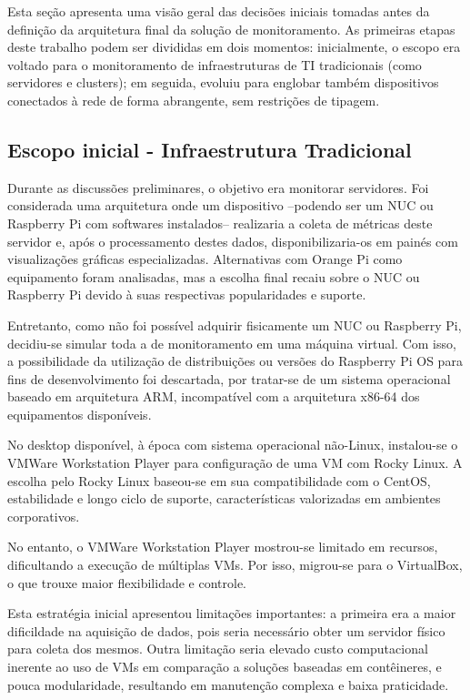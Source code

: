 {Esta seção apresenta uma visão geral das decisões iniciais tomadas antes da definição da arquitetura final da solução de monitoramento. As primeiras etapas deste trabalho podem ser divididas em dois momentos: inicialmente, o escopo era voltado para o monitoramento de infraestruturas de TI tradicionais (como servidores e clusters); em seguida, evoluiu para englobar também dispositivos conectados à rede de forma abrangente, sem restrições de tipagem.

\subsection{Escopo inicial - Infraestrutura Tradicional}
\label{subsection:EscopoInicial}

Durante as discussões preliminares, o objetivo era monitorar servidores. Foi considerada uma arquitetura onde um dispositivo --podendo ser um NUC ou Raspberry Pi com softwares instalados-- realizaria a coleta de métricas deste servidor e, após o processamento destes dados, disponibilizaria-os em painés com visualizações gráficas especializadas. Alternativas com Orange Pi como equipamento foram analisadas, mas a escolha final recaiu sobre o NUC ou Raspberry Pi devido à suas respectivas popularidades e suporte.

Entretanto, como não foi possível adquirir fisicamente um NUC ou Raspberry Pi, decidiu-se simular toda a  de monitoramento em uma máquina virtual. Com isso, a possibilidade da utilização de distribuições ou versões do Raspberry Pi OS para fins de desenvolvimento foi descartada, por tratar-se de um sistema operacional baseado em arquitetura ARM, incompatível com a arquitetura x86-64 dos equipamentos disponíveis.

No desktop disponível, à época com sistema operacional não-Linux, instalou-se o VMWare Workstation Player para configuração de uma VM com Rocky Linux. A escolha pelo Rocky Linux baseou-se em sua compatibilidade com o CentOS, estabilidade e longo ciclo de suporte, características valorizadas em ambientes corporativos.

No entanto, o VMWare Workstation Player mostrou-se limitado em recursos, dificultando a execução de múltiplas VMs. Por isso, migrou-se para o VirtualBox, o que trouxe maior flexibilidade e controle.

Esta estratégia inicial apresentou limitações importantes: a primeira era a maior dificildade na aquisição de dados, pois seria necessário obter um servidor físico para coleta dos mesmos. Outra limitação seria elevado custo computacional inerente ao uso de VMs em comparação a soluções baseadas em contêineres, e pouca modularidade, resultando em manutenção complexa e baixa praticidade.

}
